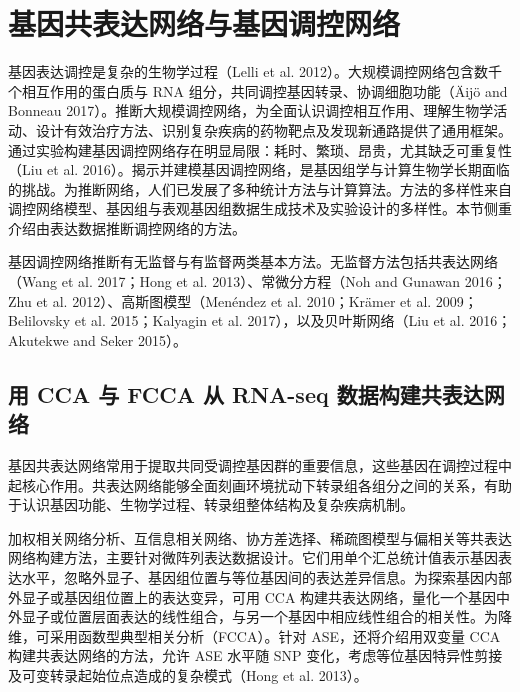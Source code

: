 \section{基因共表达网络与基因调控网络}

基因表达调控是复杂的生物学过程（Lelli et al. 2012）。大规模调控网络包含数千个相互作用的蛋白质与 RNA 组分，共同调控基因转录、协调细胞功能（Äijö and Bonneau 2017）。推断大规模调控网络，为全面认识调控相互作用、理解生物学活动、设计有效治疗方法、识别复杂疾病的药物靶点及发现新通路提供了通用框架。通过实验构建基因调控网络存在明显局限：耗时、繁琐、昂贵，尤其缺乏可重复性（Liu et al. 2016）。揭示并建模基因调控网络，是基因组学与计算生物学长期面临的挑战。为推断网络，人们已发展了多种统计方法与计算算法。方法的多样性来自调控网络模型、基因组与表观基因组数据生成技术及实验设计的多样性。本节侧重介绍由表达数据推断调控网络的方法。

基因调控网络推断有无监督与有监督两类基本方法。无监督方法包括共表达网络（Wang et al. 2017；Hong et al. 2013）、常微分方程（Noh and Gunawan 2016；Zhu et al. 2012）、高斯图模型（Menéndez et al. 2010；Krämer et al. 2009；Belilovsky et al. 2015；Kalyagin et al. 2017），以及贝叶斯网络（Liu et al. 2016；Akutekwe and Seker 2015）。

\subsection{用 CCA 与 FCCA 从 RNA-seq 数据构建共表达网络}
基因共表达网络常用于提取共同受调控基因群的重要信息，这些基因在调控过程中起核心作用。共表达网络能够全面刻画环境扰动下转录组各组分之间的关系，有助于认识基因功能、生物学过程、转录组整体结构及复杂疾病机制。

加权相关网络分析、互信息相关网络、协方差选择、稀疏图模型与偏相关等共表达网络构建方法，主要针对微阵列表达数据设计。它们用单个汇总统计值表示基因表达水平，忽略外显子、基因组位置与等位基因间的表达差异信息。为探索基因内部外显子或基因组位置上的表达变异，可用 CCA 构建共表达网络，量化一个基因中外显子或位置层面表达的线性组合，与另一个基因中相应线性组合的相关性。为降维，可采用函数型典型相关分析（FCCA）。针对 ASE，还将介绍用双变量 CCA 构建共表达网络的方法，允许 ASE 水平随 SNP 变化，考虑等位基因特异性剪接及可变转录起始位点造成的复杂模式（Hong et al. 2013）。

